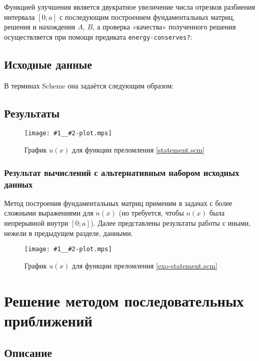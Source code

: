\documentclass{article}
\newcommand{\procname}[1]{\texttt{#1}}
\newcommand{\includeplot}[2]{\begin{figure}[hb]
    \centering
    \texttt{[image: \#1\_\_\#2-plot.mps]}
    \caption{График $u(x)$ для функции преломления \eqref{#2}}
\end{figure}}
\numberwithin{equation}{section}
\begin{document}
Функцией улучшения является двукратное увеличение числа отрезков
разбиения интервала $[0;a]$ с последующим построением фундаментальных
матриц, решения и нахождения $A$, $B$, а проверка «качества»
полученного решения осуществляется при помощи предиката
\procname{energy-conserves?}:



\clearpage

\subsection{Исходные данные}


В терминах Scheme она задаётся следующим образом:



\subsection{Результаты}



\includeplot{fundmatrix}{statement.scm}

\clearpage

\subsubsection{Результат вычислений  с альтернативным набором исходных данных}

Метод построения фундаментальных матриц применим в задачах с более
сложными выражениями для $n(x)$ (но требуется, чтобы $n(x)$ была
непрерывной внутри $[0;a]$). Далее представлены результаты работы
с иными, нежели в предыдущем разделе, данными.





\includeplot{fundmatrix}{exo-statement.scm}

\clearpage

\section{Решение методом последовательных приближений}

\subsection{Описание}
\end{document}
